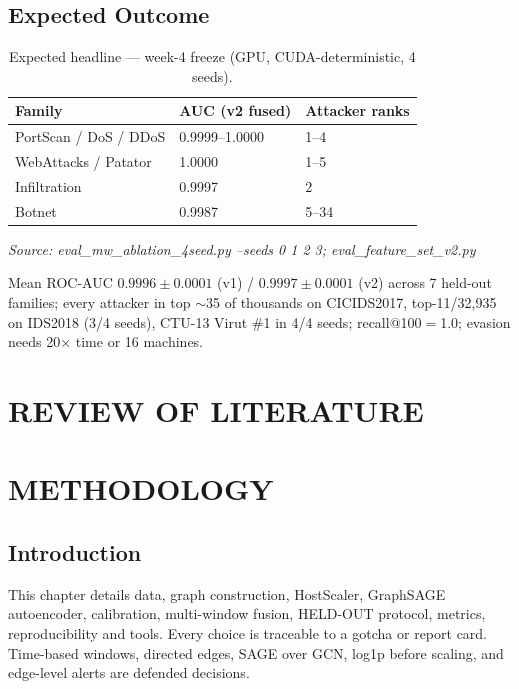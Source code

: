 \documentclass[12pt,a4paper,oneside]{report}
\newcommand{\bluetableheader}{\rowcolor{headerblue}\color{white}\bfseries}
\begin{document}
\section{Expected Outcome}

\begin{table}[H]
\centering
\caption{Expected headline — week-4 freeze (GPU, CUDA-deterministic, 4 seeds).}
\label{tab:1.3}
\begin{tabular}{|L{4.5cm}|C{3cm}|C{4.5cm}|}
\hline
\bluetableheader Family & AUC (v2 fused) & Attacker ranks \\ \hline
{} PortScan / DoS / DDoS & 0.9999--1.0000 & 1--4 \\ \hline
WebAttacks / Patator & 1.0000 & 1--5 \\ \hline
{} Infiltration & 0.9997 & 2 \\ \hline
Botnet & 0.9987 & 5--34 \\ \hline
\end{tabular}
\par\small\textit{Source: eval\_mw\_ablation\_4seed.py --seeds 0 1 2 3; eval\_feature\_set\_v2.py}
\end{table}

Mean ROC-AUC $0.9996\pm0.0001$ (v1) / $0.9997\pm0.0001$ (v2) across 7 held-out families; every attacker in top $\sim$35 of thousands on CICIDS2017, top-11/32,935 on IDS2018 (3/4 seeds), CTU-13 Virut \#1 in 4/4 seeds; recall@100$=$1.0; evasion needs 20$\times$ time or 16 machines.

\chapter{REVIEW OF LITERATURE}
\label{ch:lit}




\chapter{METHODOLOGY}
\label{ch:method}

\section{Introduction}
This chapter details data, graph construction, HostScaler, GraphSAGE autoencoder, calibration, multi-window fusion, HELD-OUT protocol, metrics, reproducibility and tools. Every choice is traceable to a gotcha or report card. Time-based windows, directed edges, SAGE over GCN, log1p before scaling, and edge-level alerts are defended decisions.
\end{document}
